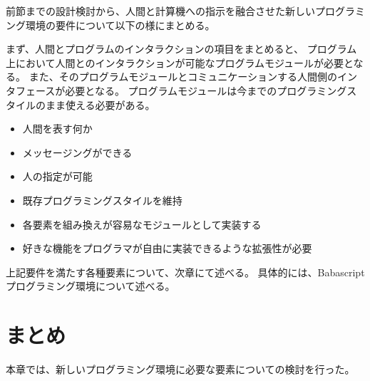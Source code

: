 前節までの設計検討から、人間と計算機への指示を融合させた新しいプログラミング環境の要件について以下の様にまとめる。

まず、人間とプログラムのインタラクションの項目をまとめると、
プログラム上において人間とのインタラクションが可能なプログラムモジュールが必要となる。
また、そのプログラムモジュールとコミュニケーションする人間側のインタフェースが必要となる。
プログラムモジュールは今までのプログラミングスタイルのまま使える必要がある。

\begin{itemize}
\itemsep1pt\parskip0pt
\item
  人間を表す何か
\item
  メッセージングができる
\item
  人の指定が可能
\item
  既存プログラミングスタイルを維持
\item
  各要素を組み換えが容易なモジュールとして実装する
\item
  好きな機能をプログラマが自由に実装できるような拡張性が必要
\end{itemize}

上記要件を満たす各種要素について、次章にて述べる。
具体的には、Babascriptプログラミング環境について述べる。

\section{まとめ}\label{ux307eux3068ux3081}

本章では、新しいプログラミング環境に必要な要素についての検討を行った。
